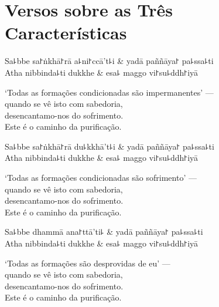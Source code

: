 \chapter{Versos sobre as Três Características}


\begin{leader}
\end{leader}

\begin{twochants}
  Sa꜕bbe sa꜓ṅkhā꜓rā a꜕ni꜓ccā't꜕i & yadā paññāya꜓ pa꜕ssa꜕ti \\
  Atha nibbinda꜕ti dukkhe & esa꜕ maggo vi꜓su꜕ddh꜓iyā \\
\end{twochants}

\begin{english}
  `Todas as formações condicionadas são impermanentes' ---\\
  quando se vê isto com sabedoria,\\
  desencantamo-nos do sofrimento.\\
  Este é o caminho da purificação.
\end{english}

\begin{twochants}
  Sa꜕bbe sa꜓ṅkhā꜓rā du꜕kkhā't꜕i & yadā paññāya꜓ pa꜕ssa꜕ti \\
  Atha nibbinda꜕ti dukkhe & esa꜕ maggo vi꜓su꜕ddh꜓iyā \\
\end{twochants}

\begin{english}
  `Todas as formações condicionadas são sofrimento' ---\\
  quando se vê isto com sabedoria,\\
  desencantamo-nos do sofrimento.\\
  Este é o caminho da purificação.
\end{english}

\begin{twochants}
  Sa꜕bbe dhammā ana꜓ttā'ti꜕ & yadā paññāya꜓ pa꜕ssa꜕ti \\
  Atha nibbinda꜕ti dukkhe & esa꜕ maggo vi꜓su꜕ddh꜓iyā \\
\end{twochants}

\begin{english}
  `Todas as formações são desprovidas de eu' ---\\
  quando se vê isto com sabedoria,\\
  desencantamo-nos do sofrimento.\\
  Este é o caminho da purificação.
\end{english}

